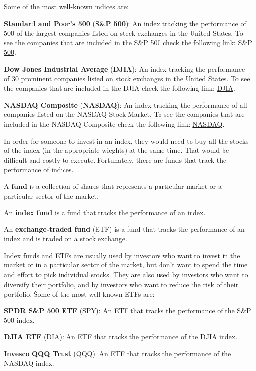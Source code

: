 Some of the most well-known indices are:
\bit
\item \textbf{Standard and Poor's 500} (\textbf{S\&P 500}): An index tracking the performance of 500 of the largest
companies listed on stock exchanges in the United States. To see the companies that are included in the S\&P 500 check
the following link: \href{https://www.slickcharts.com/sp500}{S\&P 500}.
\item \textbf{Dow Jones Industrial Average} (\textbf{DJIA}): An index tracking the performance of 30 prominent companies
listed
on stock exchanges in the United States. To see the companies that are included in the DJIA check the following link:
\href{https://www.slickcharts.com/dowjones}{DJIA}.
\item \textbf{NASDAQ Composite} (\textbf{NASDAQ}): An index tracking the performance of all companies listed on the
NASDAQ Stock Market. To see the companies that are included in the NASDAQ Composite check the following link:
\href{https://www.slickcharts.com/nasdaq100}{NASDAQ}.
\eit

In order for someone to invest in an index, they would need to buy all the stocks of the index (in the appropriate
wieghts) at the same time. That would be difficult and costly to execute. Fortunately, there are funds that track the
performance of indices.

\bd[Fund]
A \textbf{fund} is a collection of shares that represents a particular market or a particular sector of the market.
\ed

An \textbf{index fund} is a fund that tracks the performance of an index.
\ed

An \textbf{exchange-traded fund} (ETF) is a fund that tracks the performance of an index and is traded on a stock
exchange.
\ed

Index funds and ETFs are usually used by investors who want to invest in the market or in a particular sector of the
market, but don't want to spend the time and effort to pick individual stocks. They are also used by investors who
want to diversify their portfolio, and by investors who want to reduce the risk of their portfolio. \v

Some of the most well-known ETFs are:
\bit
\item \textbf{SPDR S\&P 500 ETF} (SPY): An ETF that tracks the performance of the S\&P 500 index.
\item \textbf{DJIA ETF} (DIA): An ETF that tracks the performance of the DJIA index.
\item \textbf{Invesco QQQ Trust} (QQQ): An ETF that tracks the performance of the NASDAQ index.
\eit

